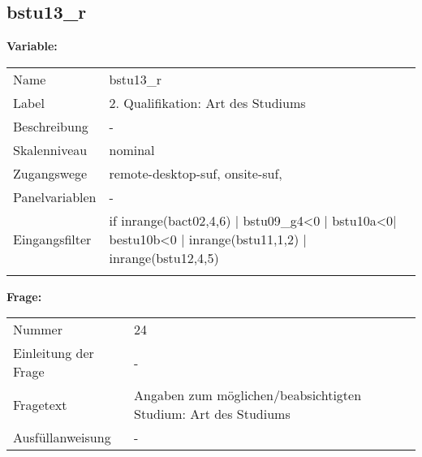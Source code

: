 	
	
	\subsection{bstu13\_r}
	\label{subSection:bstu13_r}

	\noindent\textbf{Variable:}\\
		\begin{tabular}{lL{11.3cm}}
			\label{tableVariable:bstu13_r}
			Name & bstu13\_r \\
			Label & 2. Qualifikation: Art des Studiums  \\
			Beschreibung & - \\
			Skalenniveau & nominal \\
			Zugangswege &
				remote-desktop-suf,
				onsite-suf,
 \\
			Panelvariablen & -
			 \\
			Eingangsfilter & if inrange(bact02,4,6) | bstu09\_g4\textless{}0 | bstu10a\textless{}0| bestu10b\textless{}0 | inrange(bstu11,1,2) | inrange(bstu12,4,5) \\
 \\
		\end{tabular}

		\vspace*{1 cm}
		\noindent\textbf{Frage:}\\
		\begin{tabular}{lL{11.3cm}}
			\label{tableQuestion:bstu13_r}
			Nummer & 24 \\
			Einleitung der Frage & - \\
			Fragetext & Angaben zum möglichen/beabsichtigten Studium:
Art des Studiums \\
			Ausfüllanweisung & - \\
		\end{tabular}





